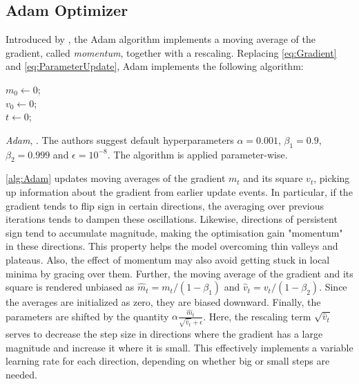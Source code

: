 \subsection{Adam Optimizer}\label{sec:AdamOptimizer}
Introduced by \citet{kingma2017adam}, the Adam algorithm implements a moving average of the gradient, called \emph{momentum}, together with a rescaling. Replacing \autoref{eq:Gradient} and \autoref{eq:ParameterUpdate}, Adam implements the following algorithm:

\begin{algorithm}[H]\label{alg:Adam}
\SetAlgoLined

$m_0 \gets 0$;\\
$v_0 \gets 0$;\\
$t \gets 0$;\\
\caption{\emph{Adam}, \cite{kingma2017adam}. The authors suggest default hyperparameters $\alpha = 0.001$, $\beta_1 = 0.9$, $\beta_2 = 0.999$ and $\epsilon = 10^{-8}$. The algorithm is applied parameter-wise.}
\end{algorithm}

\autoref{alg:Adam} updates moving averages of the gradient $m_t$ and its square $v_t$, picking up information about the gradient from earlier update events. In particular, if the gradient tends to flip sign in certain directions, the averaging over previous iterations tends to dampen these oscillations. Likewise, directions of persistent sign tend to accumulate magnitude, making the optimisation gain "momentum" in these directions. This property helps the model overcoming thin valleys and plateaus. Also, the effect of momentum may also avoid getting stuck in local minima by gracing over them. Further, the moving average of the gradient and its square is rendered unbiased as $\hat{m}_t = m_t/(1-\beta_1)$ and $\hat{v}_t = v_t/(1-\beta_2)$. Since the averages are initialized as zero, they are biased downward. Finally, the parameters are shifted by the quantity $\alpha \frac{\hat{m}_t}{\sqrt{\hat{v}_t} + \epsilon}$. Here, the rescaling term $\sqrt{\hat{v}_t}$ serves to decrease the step size in directions where the gradient has a large magnitude and increase it where it is small. This effectively implements a variable learning rate for each direction, depending on whether big or small steps are needed. 

